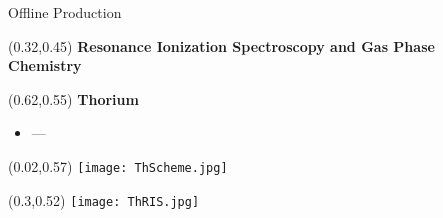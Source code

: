 \documentclass[10pt,aspectratio=169]{beamer}
\begin{document}
\begin{frame}{Offline Production}
{		\begin{textblock*}{0.7\paperwidth}(0.32\paperwidth,0.45\paperheight)
			\textbf{Resonance Ionization Spectroscopy and Gas Phase Chemistry}
		\end{textblock*}

		\begin{textblock*}{0.35\paperwidth}(0.62\paperwidth,0.55\paperheight)
			\textbf{Thorium}
			\begin{itemize}
				\item ---
			\end{itemize}
		\end{textblock*}
		\begin{textblock*}{0.15\paperwidth}(0.02\paperwidth,0.57\paperheight)
			\texttt{[image: ThScheme.jpg]}
		\end{textblock*}
		\begin{textblock*}{0.3\paperwidth}(0.3\paperwidth,0.52\paperheight)
			\texttt{[image: ThRIS.jpg]}
		\end{textblock*}
	}
\end{frame}
\end{document}
